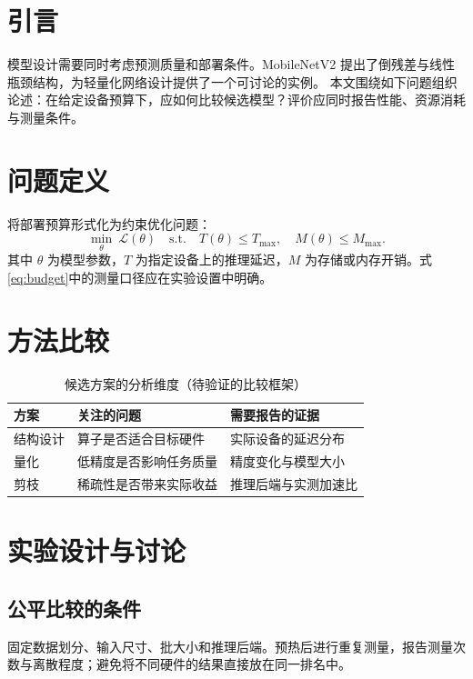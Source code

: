 \documentclass[UTF8,fontset=fandol,a4paper,zihao=-4]{ctexart}
\begin{document}
\uestccover
\begin{abstract}
边缘设备的推理任务同时受到计算资源、存储空间和响应时间约束。本文以课程论文写作为场景，演示摘要、章节结构、方法比较、公式、交叉引用与参考文献的排版方式。示例仅提供讨论框架，不包含真实实验结论。使用时应将研究问题、方法、证据和局限替换为自己的内容。
\end{abstract}
\section{引言}
模型设计需要同时考虑预测质量和部署条件。MobileNetV2 提出了倒残差与线性瓶颈结构\cite{sandler2018}，为轻量化网络设计提供了一个可讨论的实例。
本文围绕如下问题组织论述：在给定设备预算下，应如何比较候选模型？评价应同时报告性能、资源消耗与测量条件。
\section{问题定义}
将部署预算形式化为约束优化问题：
\begin{equation}\label{eq:budget}
\min_{\theta}\ \mathcal{L}(\theta)\quad
\text{s.t.}\quad T(\theta)\leq T_{\max},\quad M(\theta)\leq M_{\max}.
\end{equation}
其中 $\theta$ 为模型参数，$T$ 为指定设备上的推理延迟，$M$ 为存储或内存开销。式\eqref{eq:budget}中的测量口径应在实验设置中明确。
\section{方法比较}
\begin{table}[htbp]\centering
\caption{候选方案的分析维度（待验证的比较框架）}
\begin{tabularx}{\linewidth}{@{}lXX@{}}\toprule
方案 & 关注的问题 & 需要报告的证据\\\midrule
结构设计 & 算子是否适合目标硬件 & 实际设备的延迟分布\\
量化 & 低精度是否影响任务质量 & 精度变化与模型大小\\
剪枝 & 稀疏性是否带来实际收益 & 推理后端与实测加速比\\\bottomrule
\end{tabularx}
\end{table}
\clearpage
\section{实验设计与讨论}
\subsection{公平比较的条件}
固定数据划分、输入尺寸、批大小和推理后端。预热后进行重复测量，报告测量次数与离散程度；避免将不同硬件的结果直接放在同一排名中。
\end{document}
